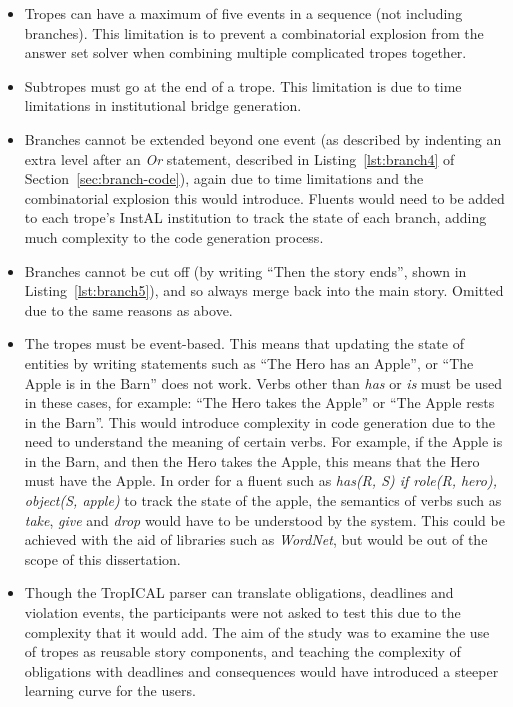 \documentclass[11pt]{report}
\begin{document}
\begin{itemize}
  \item Tropes can have a maximum of five events in a sequence (not including
    branches). This limitation is to prevent a combinatorial explosion from the
    answer set solver when combining multiple complicated tropes together.
  \item Subtropes must go at the end of a trope. This limitation is due to time
    limitations in institutional bridge generation.
  \item Branches cannot be extended beyond one event (as described by indenting
    an extra level after an \emph{Or} statement, described in
    Listing~\ref{lst:branch4} of Section~\ref{sec:branch-code}), again due to time
    limitations and the combinatorial explosion this would introduce. Fluents
    would need to be added to each trope's InstAL institution to track the state
    of each branch, adding much complexity to the code generation process.
  \item Branches cannot be cut off (by writing ``Then the story ends'', shown in
    Listing~\ref{lst:branch5}), and so
    always merge back into the main story. Omitted due to the same reasons as above.
  \item The tropes must be event-based. This means that updating the state of
    entities by writing statements such as ``The Hero has an Apple'', or ``The
    Apple is in the Barn'' does not work. Verbs other than \emph{has} or
    \emph{is} must be used in these cases, for example: ``The Hero takes the
    Apple'' or ``The Apple rests in the Barn''. This would introduce complexity in
    code generation due to the need to understand the meaning of certain verbs.
    For example, if the Apple is in the Barn, and then the Hero takes the Apple,
    this means that the Hero must have the Apple. In order for a fluent such as
    \emph{has(R, S) if role(R, hero), object(S, apple)} to track the state of
    the apple, the semantics of verbs such as \emph{take}, \emph{give} and
    \emph{drop} would have to be understood by the system. This could be
    achieved with the aid of libraries such as \emph{WordNet}, but would be out
    of the scope of this dissertation.
  \item Though the TropICAL parser can translate obligations, deadlines and
    violation events, the participants were not asked to
    test this due to the complexity that it would add. The aim of the study was
    to examine the use of tropes as reusable story components, and teaching the
    complexity of obligations with deadlines and consequences would have
    introduced a steeper learning curve for the users.
\end{itemize}
\end{document}
